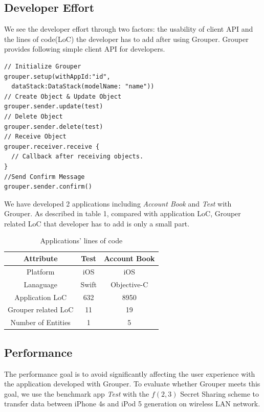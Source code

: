 \documentclass[twocolumn,10pt]{article}
\begin{document}
\subsection{Developer Effort}

We see the developer effort through two factors: the usability of client API and the lines of code(LoC) the developer has to add after using Grouper. Grouper provides following simple client API for developers.

\begin{lstlisting}
// Initialize Grouper
grouper.setup(withAppId:"id",
  dataStack:DataStack(modelName: "name")) 
// Create Object & Update Object
grouper.sender.update(test)
// Delete Object
grouper.sender.delete(test)
// Receive Object
grouper.receiver.receive { 
  // Callback after receiving objects.
}
//Send Confirm Message
grouper.sender.confirm()
\end{lstlisting}

We have developed 2 applications including \emph{Account Book} and \emph{Test} with Grouper. As described in table 1, compared with application LoC, Grouper related LoC that developer has to add is only a small part. 

\begin{table}[!htb]
	\centering
	\caption{Applications' lines of code}
	\label{my-label}
	\begin{tabular}{c|c|c}
		\hline
		Attribute           & Test  & Account Book \\ \hline
		Platform            & iOS   & iOS          \\ \hline
		Lanaguage           & Swift & Objective-C  \\ \hline
		Application LoC     & 632   & 8950         \\ \hline
		Grouper related LoC & 11    & 19           \\ \hline
		Number of Entities  & 1     & 5            \\ \hline
	\end{tabular}
\end{table}

\subsection{Performance}

The performance goal is to avoid significantly affecting the user experience with the application developed with Grouper. To evaluate whether Grouper meets this goal, we use the benchmark app \emph{Test} with the $f(2, 3)$ Secret Sharing scheme to transfer data between iPhone 4s and iPod 5 generation on wireless LAN network.
\end{document}
